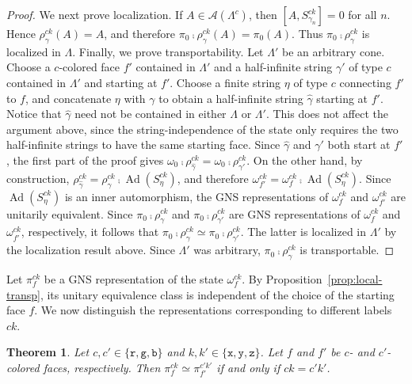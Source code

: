 \documentclass[a4paper,11pt]{article}
\newtheorem{theorem}{Theorem}[section]
\theoremstyle{definition}
\theoremstyle{remark}
\theoremstyle{remark}
\begin{document}
\begin{proof}
    We next prove localization. If $A\in\mathcal{A}(\Lambda^c)$, then $[A,S_{\gamma_n}^{ck}]=0$ for all $n$. Hence $\rho_\gamma^{ck}(A)=A$, and therefore $\pi_0\comp\rho_\gamma^{ck}(A)=\pi_0(A)$. Thus $\pi_0\comp\rho_\gamma^{ck}$ is localized in $\Lambda$.
    Finally, we prove transportability. Let $\Lambda'$ be an arbitrary cone. Choose a $c$-colored face $f'$ contained in $\Lambda'$ and a half-infinite string $\gamma'$ of type $c$ contained in $\Lambda'$ and starting at $f'$. Choose a finite string $\eta$ of type $c$ connecting $f'$ to $f$, and concatenate $\eta$ with $\gamma$ to obtain a half-infinite string $\widehat{\gamma}$ starting at $f'$. Notice that $\widehat{\gamma}$ need not be contained in either $\Lambda$ or $\Lambda'$. This does not affect the argument above, since the string-independence of the state only requires the two half-infinite strings to have the same starting face. Since $\widehat{\gamma}$ and $\gamma'$ both start at $f'$, the first part of the proof gives $\omega_0\comp\rho_{\widehat{\gamma}}^{ck} = \omega_0\comp\rho_{\gamma'}^{ck}$. On the other hand, by construction, $\rho_{\widehat{\gamma}}^{ck} = \rho_\gamma^{ck} \comp \operatorname{Ad}(S_{\eta}^{ck})$, and therefore $\omega_{f'}^{ck} = \omega_f^{ck}\comp\operatorname{Ad}(S_{\eta}^{ck})$. Since $\operatorname{Ad}(S_{\eta}^{ck})$ is an inner automorphism, the GNS representations of $\omega_f^{ck}$ and $\omega_{f'}^{ck}$ are unitarily equivalent. Since $\pi_0\comp\rho_\gamma^{ck}$ and $\pi_0\comp\rho_{\gamma'}^{ck}$ are GNS representations of $\omega_f^{ck}$ and $\omega_{f'}^{ck}$, respectively, it follows that $\pi_0\comp\rho_\gamma^{ck} \simeq \pi_0\comp\rho_{\gamma'}^{ck}$. The latter is localized in $\Lambda'$ by the localization result above. Since $\Lambda'$ was arbitrary, $\pi_0\comp\rho_\gamma^{ck}$ is transportable.
\end{proof}



Let $\pi_f^{ck}$ be a GNS representation of the state $\omega_f^{ck}$. By Proposition~\ref{prop:local-transp}, its unitary equivalence class is independent of the choice of the starting face $f$. We now distinguish the representations corresponding to different labels $ck$.

\begin{theorem}\label{thm:sectors}
    Let $c,c'\in\{\mathtt{r},\mathtt{g},\mathtt{b}\}$ and $k,k'\in\{\mathtt{x},\mathtt{y},\mathtt{z}\}$. Let $f$ and $f'$ be $c$- and $c'$-colored faces, respectively. Then $\pi_f^{ck}\simeq \pi_{f'}^{c'k'}$ if and only if $ck=c'k'$. 
\end{theorem}
\end{document}
